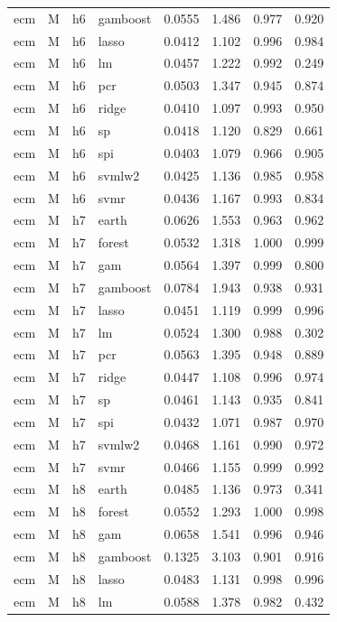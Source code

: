\begin{ThreePartTable}
\begin{longtable}[t]{llclcccc}
ecm & M & h6 & gamboost & 0.0555 & 1.486 & 0.977 & 0.920\\
ecm & M & h6 & lasso & 0.0412 & 1.102 & 0.996 & 0.984\\
ecm & M & h6 & lm & 0.0457 & 1.222 & 0.992 & 0.249\\
ecm & M & h6 & pcr & 0.0503 & 1.347 & 0.945 & 0.874\\
ecm & M & h6 & ridge & 0.0410 & 1.097 & 0.993 & 0.950\\
ecm & M & h6 & sp & 0.0418 & 1.120 & 0.829 & 0.661\\
ecm & M & h6 & spi & 0.0403 & 1.079 & 0.966 & 0.905\\
ecm & M & h6 & svmlw2 & 0.0425 & 1.136 & 0.985 & 0.958\\
ecm & M & h6 & svmr & 0.0436 & 1.167 & 0.993 & 0.834\\
\addlinespace
ecm & M & h7 & earth & 0.0626 & 1.553 & 0.963 & 0.962\\
ecm & M & h7 & forest & 0.0532 & 1.318 & 1.000 & 0.999\\
ecm & M & h7 & gam & 0.0564 & 1.397 & 0.999 & 0.800\\
ecm & M & h7 & gamboost & 0.0784 & 1.943 & 0.938 & 0.931\\
ecm & M & h7 & lasso & 0.0451 & 1.119 & 0.999 & 0.996\\
ecm & M & h7 & lm & 0.0524 & 1.300 & 0.988 & 0.302\\
ecm & M & h7 & pcr & 0.0563 & 1.395 & 0.948 & 0.889\\
ecm & M & h7 & ridge & 0.0447 & 1.108 & 0.996 & 0.974\\
ecm & M & h7 & sp & 0.0461 & 1.143 & 0.935 & 0.841\\
ecm & M & h7 & spi & 0.0432 & 1.071 & 0.987 & 0.970\\
ecm & M & h7 & svmlw2 & 0.0468 & 1.161 & 0.990 & 0.972\\
ecm & M & h7 & svmr & 0.0466 & 1.155 & 0.999 & 0.992\\
\addlinespace
ecm & M & h8 & earth & 0.0485 & 1.136 & 0.973 & 0.341\\
ecm & M & h8 & forest & 0.0552 & 1.293 & 1.000 & 0.998\\
ecm & M & h8 & gam & 0.0658 & 1.541 & 0.996 & 0.946\\
ecm & M & h8 & gamboost & 0.1325 & 3.103 & 0.901 & 0.916\\
ecm & M & h8 & lasso & 0.0483 & 1.131 & 0.998 & 0.996\\
ecm & M & h8 & lm & 0.0588 & 1.378 & 0.982 & 0.432\\

\end{longtable}
\end{ThreePartTable}
